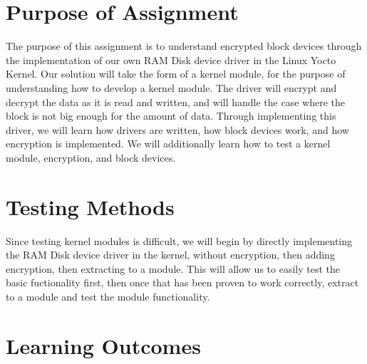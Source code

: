 \documentclass[letterpaper,10pt]{article}
\begin{document}
\section{Purpose of Assignment}
The purpose of this assignment is to understand encrypted block devices through the implementation of 
our own RAM Disk device driver in the Linux Yocto Kernel. 
Our solution will take the form of a kernel module, for the purpose of understanding how to develop a 
kernel module. 
The driver will encrypt and decrypt the data as it is read and written, and will handle the case where 
the block is not big enough for the amount of data. 
Through implementing this driver, we will learn how drivers are written, how block devices work, and 
how encryption is implemented. 
We will additionally learn how to test a kernel module, encryption, and block devices.

\section{Testing Methods}
Since testing kernel modules is difficult, we will begin by directly implementing the RAM Disk device 
driver in the kernel, without encryption, then adding encryption, then extracting to a module. 
This will allow us to easily test the basic fuctionality first, then once that has been proven to work 
correctly, extract to a module and test the module functionality.

\section{Learning Outcomes}
\end{document}
